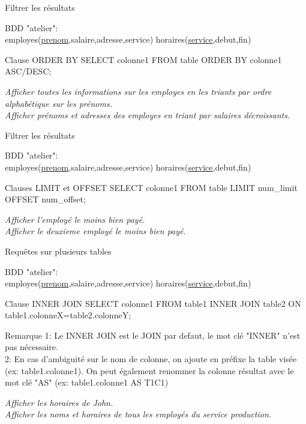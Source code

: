 \documentclass[xetex,dvipsnames]{beamer}
\begin{document}
\begin{frame}[t]{Filtrer les résultats}
\begin{small}
		BDD "atelier": \\employes(\underline{prenom},salaire,adresse,service) horaires(\underline{service},debut,fin)
\end{small}	
	\begin{alertblock}{Clause ORDER BY}
		SELECT colonne1 FROM table ORDER BY colonne1 ASC/DESC;
	\end{alertblock}
	
		\textit{Afficher toutes les informations sur les employes en les triants par ordre alphabétique sur les prénoms.}\\
		\textit{Afficher prénoms et adresses des employes en triant par salaires décroissants.}\\
\end{frame}


\begin{frame}[t]{Filtrer les résultats}
\begin{small}
		BDD "atelier": \\employes(\underline{prenom},salaire,adresse,service) horaires(\underline{service},debut,fin)
\end{small}	
	\begin{alertblock}{Clauses LIMIT et OFFSET}
		SELECT colonne1 FROM table LIMIT num\_limit OFFSET num\_offset;
	\end{alertblock}
		\textit{Afficher l'employé le moins bien payé.}\\
		\textit{Afficher le deuxieme employé le moins bien payé.}\\
\end{frame}

\begin{frame}[t]{Requêtes sur plusieurs tables}
\begin{small}
		BDD "atelier": \\employes(\underline{prenom},salaire,adresse,service) horaires(\underline{service},debut,fin)
\end{small}	
	\begin{alertblock}{Clause INNER JOIN}
		SELECT colonne1 FROM table1 INNER JOIN table2 ON table1.colonneX=table2.colonneY;
	\end{alertblock}
\begin{footnotesize}
	\begin{block}{Remarque}
	 1: Le INNER JOIN est le JOIN par defaut, le mot clé "INNER" n'est pas nécessaire.
	\\2: En cas d'ambiguité sur le nom de colonne, on ajoute en préfixe la table visée (ex: table1.colonne1). On peut également renommer la colonne résultat avec le mot clé "AS" (ex: table1.colonne1 AS T1C1)
	\end{block}
\end{footnotesize}
		
		\textit{Afficher les horaires de John.}\\
		\textit{Afficher les noms et horaires de tous les employés du service production.}\\
\end{frame}
\end{document}
